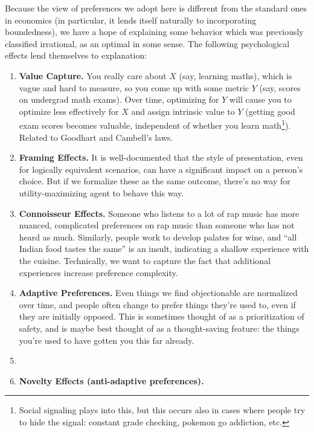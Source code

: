 \documentclass{article}
\begin{document}
	Because the view of preferences we adopt here is different from the standard ones in economics (in particular, it lends itself naturally to incorporating boundedness), we have a hope of explaining some behavior which was previously classified irrational, as an optimal in some sense. The following psychological effects lend themselves to explanation:
	\begin{enumerate}[noitemsep]
		\item \textbf{Value Capture.} You really care about $X$ (say, learning maths), which is vague and hard to measure, so you come up with some metric $Y$ (say, scores on undergrad math exams). Over time, optimizing for $Y$ will cause you to optimize less effectively for $X$ and assign intrinsic value to $Y$ (getting good exam scores becomes valuable, independent of whether you learn math\footnote{Social signaling plays into this, but this occurs also in cases where people try to hide the signal: constant grade checking, pokemon go addiction, etc.}). Related to Goodhart and Cambell's laws.
		\item \textbf{Framing Effects.} It is well-documented that the style of presentation, even for logically equivalent scenarios, can have a significant impact on a person's choice. But if we formalize these as the same outcome, there's no way for utility-maximizing agent to behave this way.
		\item \textbf{Connoisseur Effects.} Someone who listens to a lot of rap music has more nuanced, complicated preferences on rap music than someone who has not heard as much. Similarly, people work to develop palates for wine, and ``all Indian food tastes the same'' is an insult, indicating a shallow experience with the cuisine. Technically, we want to capture the fact that additional experiences increase preference complexity.
		
		\item \textbf{Adaptive Preferences.} Even things we find objectionable are normalized over time, and people often change to prefer things they're used to, even if they are initially opposed. This is sometimes thought of as a prioritization of safety, and is maybe best thought of as a thought-saving feature: the things you're used to have gotten you this far already. 
		
		\item \textbf{}
		 
		\item \textbf{Novelty Effects (anti-adaptive preferences).} 

	\end{enumerate}
\end{document}
